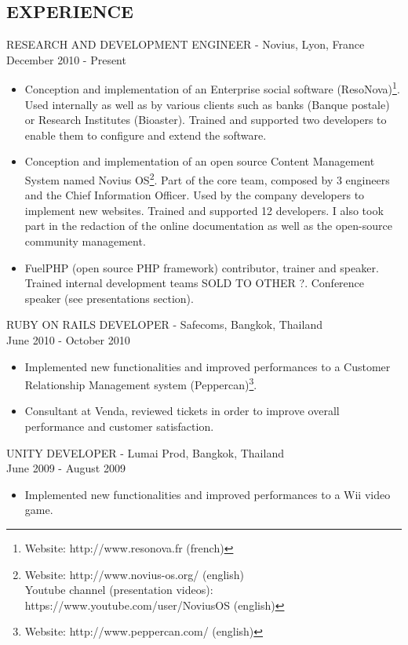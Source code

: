\documentclass[11pt]{res} %
\begin{document}
\begin{resume}
\section{EXPERIENCE} 
 RESEARCH AND DEVELOPMENT ENGINEER - Novius, Lyon, France \\
December 2010 - Present
\vspace{0.05in}
   \begin{itemize} \itemsep -2pt  %
   \item Conception and implementation of an Enterprise social software (ResoNova)\footnote{Website: http://www.resonova.fr (french)}.
Used internally as well as by various clients such as banks (Banque postale) or
Research Institutes (Bioaster). Trained and supported two developers to enable them
to configure and extend the software.
   \item Conception and implementation of an open source Content Management System named Novius OS\footnote{Website: http://www.novius-os.org/ (english) \\
Youtube channel (presentation videos): https://www.youtube.com/user/NoviusOS (english)}.
Part of the core team, composed by 3 engineers and the Chief Information Officer. Used by the company
developers to implement new websites. Trained and supported 12 developers. I also took part in the redaction
of the online documentation as well as the open-source community management.
   \item FuelPHP (open source PHP framework) contributor, trainer and speaker. Trained internal development teams SOLD TO OTHER ?.
Conference speaker (see presentations section).
 \end{itemize}

RUBY ON RAILS DEVELOPER - Safecoms, Bangkok, Thailand \\ 
June 2010 - October 2010
\vspace{0.05in}
 \begin{itemize} \itemsep -2pt
   \item Implemented new functionalities and improved performances to a Customer Relationship Management system (Peppercan)\footnote{Website: http://www.peppercan.com/ (english)}.
  \item  Consultant at Venda, reviewed tickets in order to improve overall performance and customer satisfaction.
\end{itemize} 

UNITY DEVELOPER - Lumai Prod, Bangkok, Thailand \\ 
June 2009 - August 2009
\vspace{0.05in}
 \begin{itemize} \itemsep -2pt
   \item Implemented new functionalities and improved performances to a Wii video game.
\end{itemize} 


\end{resume}
\end{document}

